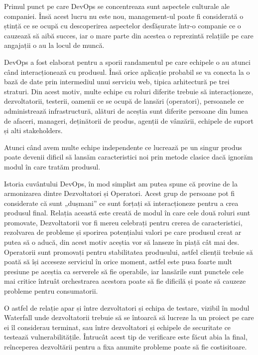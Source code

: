 Primul punct pe care DevOps se concentreaza sunt aspectele culturale ale companiei.
Însă acest lucru nu este nou, management-ul poate fi considerată o ștință
ce se ocupă cu descoperirea aspectelor desfășurate într-o companie ce o cauzează
să aibă succes, iar o mare parte din acestea o reprezintă relațiile pe care
angajații o au la locul de muncă.

DevOps a fost elaborat pentru a sporii randamentul pe care echipele o au atunci
când interacționează cu produsul. Însă orice aplicație probabil se va conecta
la o bază de date prin intermediul unui serviciu web, tipica arhitectură pe trei straturi.
Din acest motiv, multe echipe cu roluri diferite trebuie să interacționeze,
dezvoltatorii, testerii, oamenii ce se ocupă de lansări (operatori), persoanele
ce administrează infrastructură, alături de aceștia sunt diferite persoane din
lumea de afaceri, manageri, deținătorii de produs, agenții de vânzării, echipele de suport
și alti stakeholders.

Atunci când avem multe echipe independente ce lucrează pe un singur produs
poate devenii dificil să lansăm caracteristici noi prin metode clasice
dacă ignorăm modul în care tratăm produsul.

Istoria cuvântului DevOps, în mod simplist am putea spune că provine de
la armonizarea dintre Dezvoltatori și Operatori. Acest grup de persoane
pot fi considerate că sunt „dușmani” ce sunt forțați să interacționeze
pentru a crea produsul final. Relația această este creată de modul în care
cele două roluri sunt promovate, Dezvoltatorii vor fi mereu celebrați pentru
crerea de caracteristici, rezolvarea de probleme și sporirea potențialui
valori pe care produsul creat ar putea să o aducă, din acest motiv
aceștia vor să lanseze în piață cât mai des. Operatorii sunt promovați
pentru stabilitatea produsului, astfel clienții trebuie să poată să își acceseze
serviciul în orice moment, astfel este pusa foarte mult presiune pe aceștia
ca serverele să fie operabile, iar lansările sunt punctele cele mai critice
întruât orchestrarea acestora poate să fie dificilă și poate să cauzeze
probleme pentru consumatorii.

O astfel de relație apar și între dezvoltatori și echipa de testare,
vizibil în modul Waterfall unde dezvoltatorii trebuie să se întoarcă
să lucreze la un proiect pe care ei îl considerau terminat, sau între
dezvoltatori și echipele de securitate ce testează vulnerabilitățile.
Întrucât acest tip de verificare este făcut abia la final, reînceperea
dezvoltării pentru a fixa anumite probleme poate să fie costisitoare.


